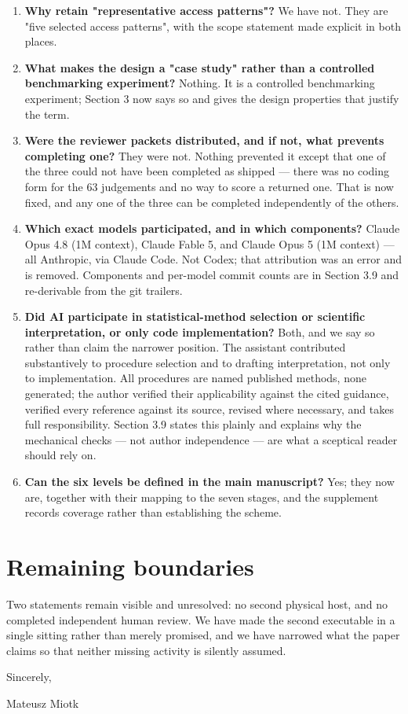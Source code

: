 \documentclass[11pt,a4paper]{article}
\begin{document}
\begin{enumerate}
  \item \textbf{Why retain "representative access patterns"?} We have not. They are "five selected access patterns", with the scope statement made explicit in both places.
  \item \textbf{What makes the design a "case study" rather than a controlled benchmarking experiment?} Nothing. It is a controlled benchmarking experiment; Section 3 now says so and gives the design properties that justify the term.
  \item \textbf{Were the reviewer packets distributed, and if not, what prevents completing one?} They were not. Nothing prevented it except that one of the three could not have been completed as shipped --- there was no coding form for the 63 judgements and no way to score a returned one. That is now fixed, and any one of the three can be completed independently of the others.
  \item \textbf{Which exact models participated, and in which components?} Claude Opus 4.8 (1M context), Claude Fable 5, and Claude Opus 5 (1M context) --- all Anthropic, via Claude Code. Not Codex; that attribution was an error and is removed. Components and per-model commit counts are in Section 3.9 and re-derivable from the git trailers.
  \item \textbf{Did AI participate in statistical-method selection or scientific interpretation, or only code implementation?} Both, and we say so rather than claim the narrower position. The assistant contributed substantively to procedure selection and to drafting interpretation, not only to implementation. All procedures are named published methods, none generated; the author verified their applicability against the cited guidance, verified every reference against its source, revised where necessary, and takes full responsibility. Section 3.9 states this plainly and explains why the mechanical checks --- not author independence --- are what a sceptical reader should rely on.
  \item \textbf{Can the six levels be defined in the main manuscript?} Yes; they now are, together with their mapping to the seven stages, and the supplement records coverage rather than establishing the scheme.
\end{enumerate}

\section*{Remaining boundaries}

Two statements remain visible and unresolved: no second physical host, and no completed independent human review. We have made the second executable in a single sitting rather than merely promised, and we have narrowed what the paper claims so that neither missing activity is silently assumed.

Sincerely,

Mateusz Miotk
\end{document}
